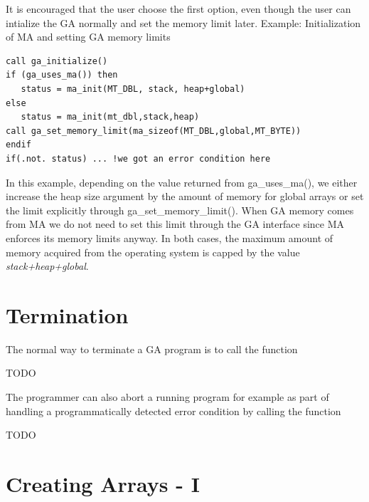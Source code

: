 It is encouraged that the user choose the first option, even though the user
can intialize the GA normally and set the memory limit later.
\newline\newline
{Example}: Initialization of MA and setting GA memory limits
\begin{lstlisting}[style=cpp]
call ga_initialize() 
if (ga_uses_ma()) then
   status = ma_init(MT_DBL, stack, heap+global) 
else 
   status = ma_init(mt_dbl,stack,heap) 
call ga_set_memory_limit(ma_sizeof(MT_DBL,global,MT_BYTE)) 
endif 
if(.not. status) ... !we got an error condition here
\end{lstlisting}
In this example, depending on the value returned from ga\_uses\_ma(), we either
increase the heap size argument by the amount of memory for global arrays or
set the limit explicitly through ga\_set\_memory\_limit().  When GA memory
comes from MA we do not need to set this limit through the GA interface since
MA enforces its memory limits anyway. In both cases, the maximum amount of
memory acquired from the operating system is capped by the value
\emph{stack+heap+global}. 

\section{Termination}

The normal way to terminate a GA program is to call the function

TODO

The programmer can also abort a running program for example as part
of handling a programmatically detected error condition by calling
the function

TODO

\section{Creating Arrays - I}

